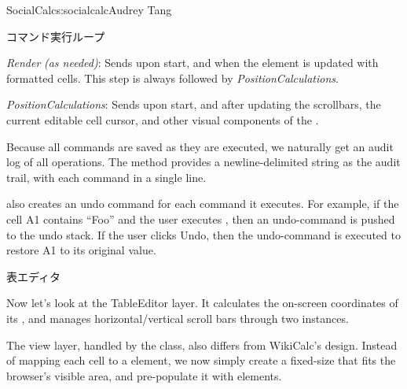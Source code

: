 \begin{aosachapter}{SocialCalc}{s:socialcalc}{Audrey Tang}
\begin{aosasect1}{コマンド実行ループ}
\begin{aosadescription}
  \item{\emph{Render}} \emph{(as{ }needed)}: Sends  upon
  start, and  when the
   element is updated with
  formatted cells. This step is always followed by \emph{PositionCalculations}.

  \item{\emph{PositionCalculations}}: Sends  upon
  start, and  after updating the scrollbars, the
  current editable cell cursor, and other visual components of the
  .

\end{aosadescription}

Because all commands are saved as they are executed, we naturally get
an audit log of all operations.  The 
method provides a newline-delimited string as the audit trail, with
each command in a single line.

 also creates an undo command for each
command it executes.  For example, if the cell A1 contains ``Foo''
and the user executes , then an undo-command
 is pushed to the undo stack.  If the user
clicks Undo, then the undo-command is executed to restore A1 to its
original value.

\end{aosasect1}

\begin{aosasect1}{表エディタ}

Now let's look at the TableEditor layer.  It calculates the on-screen
coordinates of its , and manages
horizontal/vertical scroll bars through two 
instances.


The view layer, handled by the  class, also
differs from WikiCalc's design.  Instead of mapping each cell to a
 element, we now simply create a
fixed-size  that fits the
browser's visible area, and pre-populate it with
 elements.


\end{aosasect1}
\end{aosachapter}
